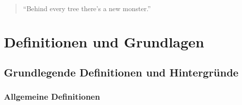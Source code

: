 \documentclass[10p,a4paper,BCOR = 12mm, DIV=15]{scrbook}
\begin{document}
\begin{quote}
"`Behind every tree there's a new monster."' \\
\end{quote}

\part{Definitionen und Grundlagen}

\label{part:def_grundlagen}

\chapter{Grundlegende Definitionen und Hintergründe}

\section{Allgemeine Definitionen}
\end{document}
